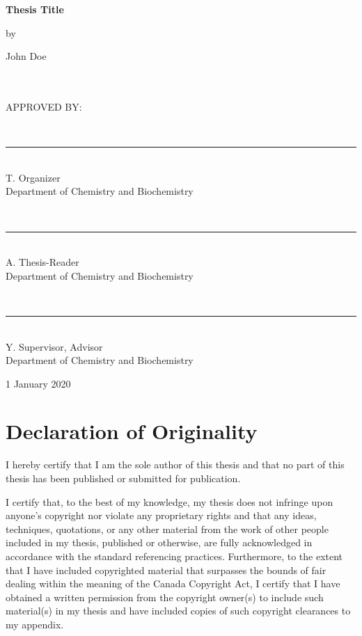\documentclass[11pt, oneside]{book} %
\newcommand{\ttitle}{Thesis Title}
\newcommand{\authornames}{John Doe}
\begin{document}
\begin{center}

{\Large \bfseries \ttitle} %

by

\authornames %

~\\~\\

APPROVED BY:


~\\

\rule{0.5\textwidth}{0.4pt}\\
T. Organizer \\
Department of Chemistry and Biochemistry

~\\

\rule{0.5\textwidth}{0.4pt}\\
A. Thesis-Reader\\
Department of Chemistry and Biochemistry

~\\

\rule{0.5\textwidth}{0.4pt}\\
Y. Supervisor, Advisor\\
Department of Chemistry and Biochemistry

\vfill

\begin{flushright}
  1 January 2020 %
\end{flushright}

\end{center}

\clearpage %


\chapter{Declaration of Originality}

I hereby certify that I am the sole author of this thesis and that no part of this thesis has been published or submitted for publication.

I certify that, to the best of my knowledge, my thesis does not infringe upon anyone's copyright nor violate any proprietary rights and that any ideas, techniques, quotations, or any other material from the work of other people included in my thesis, published or otherwise, are fully acknowledged in accordance with the standard referencing practices. Furthermore, to the extent that I have included copyrighted material that surpasses the bounds of fair dealing within the meaning of the Canada Copyright Act, I certify that I have obtained a written permission from the copyright owner(s) to include such material(s) in my thesis and have included copies of such copyright clearances to my appendix. 
 
\end{document}
